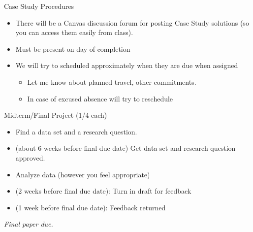 \documentclass[
  ignorenonframetext,
]{beamer}
\providecommand{\tightlist}{%
  \setlength{\itemsep}{0pt}\setlength{\parskip}{0pt}}
\begin{document}
\begin{frame}{Case Study Procedures}
\protect\hypertarget{case-study-procedures}{}
\begin{itemize}
\tightlist
\item
  There will be a Canvas discussion forum for posting Case Study
  solutions (so you can access them easily from class).
\item
  Must be present on day of completion
\item
  We will try to scheduled approximately when they are due when assigned

  \begin{itemize}
  \tightlist
  \item
    Let me know about planned travel, other commitments.
  \item
    In case of excused absence will try to reschedule
  \end{itemize}
\end{itemize}
\end{frame}

\begin{frame}{Midterm/Final Project (1/4 each)}
\protect\hypertarget{midtermfinal-project-14-each}{}
\begin{itemize}
\item
  Find a data set and a research question.
\item
  (about 6 weeks before final due date) Get data set and research
  question approved.
\item
  Analyze data (however you feel appropriate)
\item
  (2 weeks before final due date): Turn in draft for feedback
\item
  (1 week before final due date): Feedback returned
\end{itemize}

\emph{Final paper due.}
\end{frame}
\end{document}
